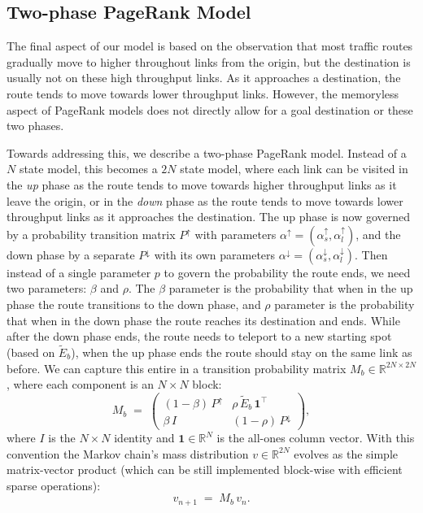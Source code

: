 \documentclass[sigconf, review]{acmart}
\newcommand{\R}{\mathbb{R}}
\begin{document}
\subsection{Two-phase {PageRank} Model}
\label{sec:2p-PR}

The final aspect of our model is based on the observation that most traffic routes gradually move to higher throughout links from the origin, but the destination is usually not on these high throughput links.  As it approaches a destination, the route tends to move towards lower throughput links.  However, the memoryless aspect of PageRank models does not directly allow for a goal destination or these two phases.  

Towards addressing this, we describe a two-phase PageRank model.  Instead of a $N$ state model, this becomes a $2N$ state model, where each link can be visited in the \emph{up} phase as the route tends to move towards higher throughput links as it leave the origin, or in the \emph{down} phase as the route tends to move towards lower throughput links as it approaches the destination.  
The up phase is now governed by a probability transition matrix $P^\uparrow$ with parameters $\alpha^\uparrow = (\alpha_s^\uparrow, \alpha_l^\uparrow)$, and the down phase by a separate $P^\downarrow$ with its own parameters $\alpha^\downarrow = (\alpha_s^\downarrow, \alpha_l^\downarrow)$.  
Then instead of a single parameter $p$ to govern the probability the route ends, we need two parameters: $\beta$ and  $\rho$.  The $\beta$ parameter is the probability that when in the up phase the route transitions to the down phase, and $\rho$ parameter is the probability that when in the down phase the route reaches its destination and ends.  While after the down phase ends, the route needs to teleport to a new starting spot (based on $\tilde E_b$), when the up phase ends the route should stay on the same link as before.  We can capture this entire in a transition probability matrix $M_b \in \R^{2N \times 2N}$, where each component is an $N \times N$ block:
\begin{equation}
\label{eq:M-block}
M_b \;=\;
\begin{pmatrix}
(1 - \beta)\, P^{\uparrow} & \rho\, \tilde E_b\, \mathbf{1}^{\top} \\[6pt]
\beta\, I                  & (1 - \rho)\, P^{\downarrow}
\end{pmatrix},
\end{equation}
where $I$ is the $N \times N$ identity and $\mathbf{1} \in
\mathbb{R}^{N}$ is the all-ones column vector. 
With this convention the Markov chain's mass distribution
$v \in \mathbb{R}^{2N}$ evolves as the simple matrix-vector product (which can be still implemented block-wise with efficient sparse operations):
\begin{equation}
\label{eq:2P-iter}
v_{n+1} \;=\; M_b\, v_n.  
\end{equation}
\end{document}
